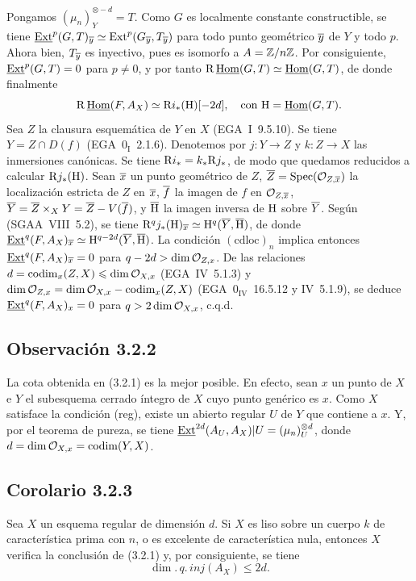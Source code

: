 Pongamos $(\mu_n)^{\otimes -d}_Y = T$. Como $G$ es localmente constante constructible, se tiene $\underline{\operatorname{Ext}}^p(G,T)_{\overline{y}} \simeq \operatorname{Ext}^p(G_{\overline{y}}, T_{\overline{y}})$ para todo punto geométrico $\overline{y}$ de $Y$ y todo $p$. Ahora bien, $T_{\overline{y}}$ es inyectivo, pues es isomorfo a $A = \mathbb{Z}/n\mathbb{Z}$. Por consiguiente, $\underline{\operatorname{Ext}}^p(G,T) = 0$ para $p \neq 0$, y por tanto $\mathrm{R}\,\underline{\operatorname{Hom}}(G,T) \simeq \underline{\operatorname{Hom}}(G,T)$, de donde finalmente
\[
\mathrm{R}\,\underline{\operatorname{Hom}}(F, A_X) \simeq \mathrm{R} i_{*}(\mathrm{H})[-2d], \quad \text{con } \mathrm{H} = \underline{\operatorname{Hom}}(G,T).
\]
Sea $Z$ la clausura esquemática de $Y$ en $X$ (EGA~I~9.5.10). Se tiene $Y = Z \cap D(f)$ (EGA~$0_{\mathrm{I}}$~2.1.6). Denotemos por $j : Y \to Z$ y $k : Z \to X$ las inmersiones canónicas. Se tiene $\mathrm{R} i_{*} = k_{*} \mathrm{R} j_{*}$, de modo que quedamos reducidos a calcular $\mathrm{R} j_{*}(\mathrm{H})$. Sean $\overline{x}$ un punto geométrico de $Z$, $\overline{Z} = \operatorname{Spec}(\mathcal{O}_{Z,\overline{x}})$ la localización estricta de $Z$ en $\overline{x}$, $\overline{f}$ la imagen de $f$ en $\mathcal{O}_{Z,\overline{x}}$, $\overline{Y} = \overline{Z} \times_X Y = \overline{Z} - V(\overline{f})$, y $\overline{\mathrm{H}}$ la imagen inversa de $\mathrm{H}$ sobre $\overline{Y}$. Según (SGAA~VIII~5.2), se tiene $\mathrm{R}^q j_{*}(\mathrm{H})_{\overline{x}} \simeq \mathrm{H}^q(\overline{Y}, \overline{\mathrm{H}})$, de donde $\underline{\operatorname{Ext}}^q(F, A_X)_{\overline{x}} \simeq \mathrm{H}^{q-2d}(\overline{Y}, \overline{\mathrm{H}})$. La condición $(\mathrm{cdloc})_n$ implica entonces $\underline{\operatorname{Ext}}^q(F, A_X)_{\overline{x}} = 0$ para $q - 2d > \dim \mathcal{O}_{Z,x}$. De las relaciones $d = \operatorname{codim}_{x}(Z,X) \leqslant \dim \mathcal{O}_{X,x}$ (EGA~IV~5.1.3) y $\dim \mathcal{O}_{Z,x} = \dim \mathcal{O}_{X,x} - \operatorname{codim}_{x}(Z,X)$ (EGA~$0_{\mathrm{IV}}$~16.5.12 y IV~5.1.9), se deduce $\underline{\operatorname{Ext}}^q(F, A_X)_x = 0$ para $q > 2\dim \mathcal{O}_{X,x}$, c.q.d.

\subsection*{Observación 3.2.2}
La cota obtenida en (3.2.1) es la mejor posible. En efecto, sean $x$ un punto de $X$ e $Y$ el subesquema cerrado íntegro de $X$ cuyo punto genérico es $x$. Como $X$ satisface la condición (reg), existe un abierto regular $U$ de $Y$ que contiene a $x$. Y, por el teorema de pureza, se tiene $\underline{\operatorname{Ext}}^{2d}(A_U, A_X)|U = (\mu_n)^{\otimes d}_U$, donde $d = \dim \mathcal{O}_{X,x} = \operatorname{codim}(Y,X)$.

\subsection*{Corolario 3.2.3}
Sea $X$ un esquema regular de dimensión $d$. Si $X$ es liso sobre un cuerpo $k$ de característica prima con $n$, o es excelente de característica nula, entonces $X$ verifica la conclusión de (3.2.1) y, por consiguiente, se tiene
\[
\dim.\,q.\,inj(A_X) \leqslant 2d.
\]

